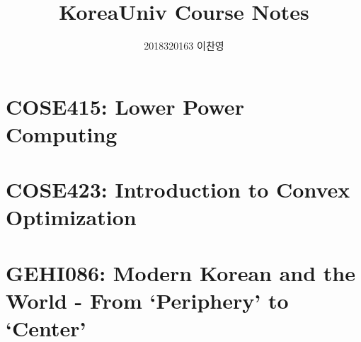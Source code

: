 \documentclass[a4paper,10pt,hidelinks]{book}
\title{KoreaUniv Course Notes}
\author{2018320163 이찬영}
\date{}
\begin{document}
    \maketitle
    \tableofcontents
    \setimgdir
    \chapter{COSE415: Lower Power Computing}
    \chapter{COSE423: Introduction to Convex Optimization}
    \chapter{GEHI086: Modern Korean and the World - From `Periphery' to `Center'}
\end{document}
